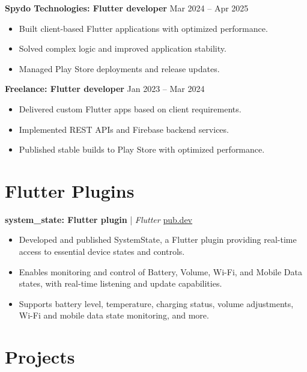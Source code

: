 \documentclass[a4paper,11pt]{article}
\begin{document}
\textbf{Spydo Technologies: Flutter developer} \hfill Mar 2024 -- Apr 2025
\begin{itemize}[leftmargin=1.5em, itemsep=2pt, topsep=4pt]
    \item Built client-based Flutter applications with optimized performance.
    \item Solved complex logic and improved application stability.
    \item Managed Play Store deployments and release updates.
\end{itemize}

\textbf{Freelance: Flutter developer} \hfill Jan 2023 -- Mar 2024
\begin{itemize}[leftmargin=1.5em, itemsep=2pt, topsep=4pt]
    \item Delivered custom Flutter apps based on client requirements.
    \item Implemented REST APIs and Firebase backend services.
    \item Published stable builds to Play Store with optimized performance.
\end{itemize}

\section{Flutter Plugins}

\textbf{system\_state: Flutter plugin} | \textit{Flutter} \hfill \href{https://pub.dev/packages/system_state}{pub.dev}
\begin{itemize}[leftmargin=1.5em, itemsep=2pt, topsep=4pt]
    \item Developed and published SystemState, a Flutter plugin providing real-time access to essential device states and controls.
    \item Enables monitoring and control of Battery, Volume, Wi-Fi, and Mobile Data states, with real-time listening and update capabilities.
    \item Supports battery level, temperature, charging status, volume adjustments, Wi-Fi and mobile data state monitoring, and more.
\end{itemize}

\section{Projects}
\end{document}
